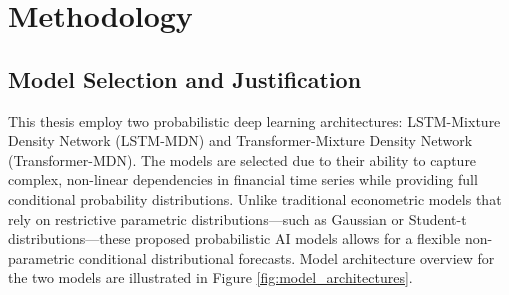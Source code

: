 \section{Methodology}
\label{sec:5_methods}

\subsection{Model Selection and Justification}
\label{sec:model_selection_and_justification}
This thesis employ two probabilistic deep learning architectures: LSTM-Mixture Density Network (LSTM-MDN) and Transformer-Mixture Density Network (Transformer-MDN). The models are selected due to their ability to capture complex, non-linear dependencies in financial time series while providing full conditional probability distributions. Unlike traditional econometric models that rely on restrictive parametric distributions—such as Gaussian or Student-t distributions—these proposed probabilistic AI models allows for a flexible non-parametric conditional distributional forecasts. Model architecture overview for the two models are illustrated in Figure \ref{fig:model_architectures}.

